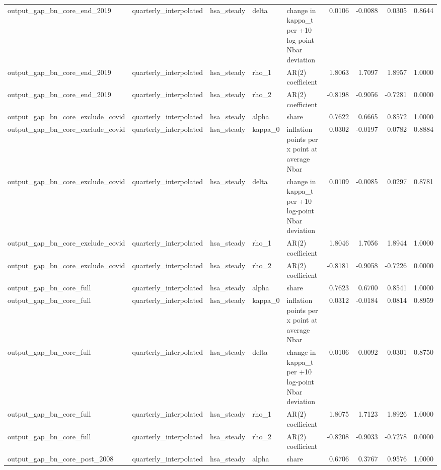 \begin{tabular}{lllllrrrr}
output\_gap\_bn\_core\_end\_2019 & quarterly\_interpolated & hsa\_steady & delta & change in kappa\_t per +10 log-point Nbar deviation & 0.0106 & -0.0088 & 0.0305 & 0.8644 \\
output\_gap\_bn\_core\_end\_2019 & quarterly\_interpolated & hsa\_steady & rho\_1 & AR(2) coefficient & 1.8063 & 1.7097 & 1.8957 & 1.0000 \\
output\_gap\_bn\_core\_end\_2019 & quarterly\_interpolated & hsa\_steady & rho\_2 & AR(2) coefficient & -0.8198 & -0.9056 & -0.7281 & 0.0000 \\
output\_gap\_bn\_core\_exclude\_covid & quarterly\_interpolated & hsa\_steady & alpha & share & 0.7622 & 0.6665 & 0.8572 & 1.0000 \\
output\_gap\_bn\_core\_exclude\_covid & quarterly\_interpolated & hsa\_steady & kappa\_0 & inflation points per x point at average Nbar & 0.0302 & -0.0197 & 0.0782 & 0.8884 \\
output\_gap\_bn\_core\_exclude\_covid & quarterly\_interpolated & hsa\_steady & delta & change in kappa\_t per +10 log-point Nbar deviation & 0.0109 & -0.0085 & 0.0297 & 0.8781 \\
output\_gap\_bn\_core\_exclude\_covid & quarterly\_interpolated & hsa\_steady & rho\_1 & AR(2) coefficient & 1.8046 & 1.7056 & 1.8944 & 1.0000 \\
output\_gap\_bn\_core\_exclude\_covid & quarterly\_interpolated & hsa\_steady & rho\_2 & AR(2) coefficient & -0.8181 & -0.9058 & -0.7226 & 0.0000 \\
output\_gap\_bn\_core\_full & quarterly\_interpolated & hsa\_steady & alpha & share & 0.7623 & 0.6700 & 0.8541 & 1.0000 \\
output\_gap\_bn\_core\_full & quarterly\_interpolated & hsa\_steady & kappa\_0 & inflation points per x point at average Nbar & 0.0312 & -0.0184 & 0.0814 & 0.8959 \\
output\_gap\_bn\_core\_full & quarterly\_interpolated & hsa\_steady & delta & change in kappa\_t per +10 log-point Nbar deviation & 0.0106 & -0.0092 & 0.0301 & 0.8750 \\
output\_gap\_bn\_core\_full & quarterly\_interpolated & hsa\_steady & rho\_1 & AR(2) coefficient & 1.8075 & 1.7123 & 1.8926 & 1.0000 \\
output\_gap\_bn\_core\_full & quarterly\_interpolated & hsa\_steady & rho\_2 & AR(2) coefficient & -0.8208 & -0.9033 & -0.7278 & 0.0000 \\
output\_gap\_bn\_core\_post\_2008 & quarterly\_interpolated & hsa\_steady & alpha & share & 0.6706 & 0.3767 & 0.9576 & 1.0000 \\

\end{tabular}

